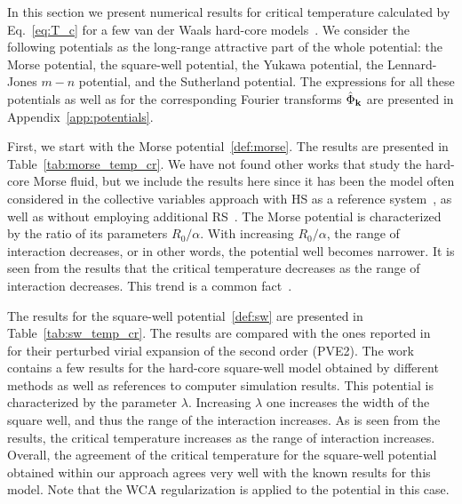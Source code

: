 In this section we present numerical results for critical temperature calculated by Eq.~\eqref{eq:T_c} for a few van der Waals hard-core models~\cite{KreiciNezbeda2012}. We consider the following potentials as the long-range attractive part of the whole potential: the Morse potential, the square-well potential, the Yukawa potential, the Lennard-Jones $m-n$ potential, and the Sutherland potential. The expressions for all these potentials as well as for the corresponding Fourier transforms $\hat{\Phi}_{\vb k}$ are presented in Appendix~\ref{app:potentials}.

First, we start with the Morse potential~\eqref{def:morse}. The results are presented in Table~\ref{tab:morse_temp_cr}.  We have not found other works that study the hard-core Morse fluid, but we include the results here since it has been the model often considered in the collective variables approach with HS as a reference system~\cite{Yukh1990,YukhJSP1995,PatsJSP1995}, as well as without employing additional RS~\cite{PylMpkDobUPJ2023b,PylJML2023}. The Morse potential is characterized by the ratio of its parameters $R_0/\alpha$. With increasing $R_0/\alpha$, the range of interaction decreases, or in other words, the potential well becomes narrower. It is seen from the results that the critical temperature decreases as the range of interaction decreases. This trend is a common fact~\cite{KreiciNezbeda2012,MendoubWaxJakse2010}.

The results for the square-well potential~\eqref{def:sw} are presented in Table~\ref{tab:sw_temp_cr}. The results are compared with the ones reported in~\cite{KreiciNezbeda2012} for their perturbed virial expansion of the second order (PVE2). The work~\cite{KreiciNezbeda2012} contains a few results for the hard-core square-well model obtained by different methods as well as references to computer simulation results. This potential is characterized by the parameter $\lambda$. Increasing $\lambda$ one increases the width of the square well, and thus the range of the interaction increases. As is seen from the results, the critical temperature increases as the range of interaction increases. Overall, the agreement of the critical temperature for the square-well potential obtained within our approach agrees very well with the known results for this model. Note that the WCA regularization is applied to the potential in this case.

